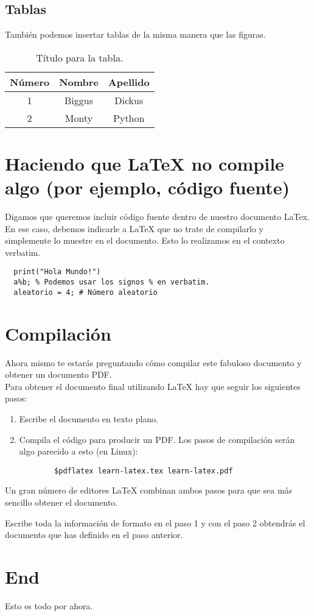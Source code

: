 \documentclass[12pt]{article}
\begin{document}
\subsection{Tablas}
También podemos insertar tablas de la misma manera que las figuras.

\begin{table}[H]
  \caption{Título para la tabla.}
  \begin{tabular}{c|cc}
    Número & Nombre & Apellido \\
    \hline %
    1 & Biggus & Dickus \\
    2 & Monty & Python
  \end{tabular}
\end{table}


\section{Haciendo que LaTeX no compile algo (por ejemplo, código fuente)}
Digamos que queremos incluir código fuente dentro de nuestro documento LaTex. En ese caso, debemos indicarle a LaTeX que no trate de compilarlo y simplemente lo muestre en el documento. Esto lo realizamos en el contexto verbatim.

\begin{verbatim}
  print("Hola Mundo!")
  a%b; % Podemos usar los signos % en verbatim.
  aleatorio = 4; # Número aleatorio
\end{verbatim}

\section{Compilación}

Ahora mismo te estarás preguntando cómo compilar este fabuloso documento y obtener un documento PDF.\\
Para obtener el documento final utilizando LaTeX hay que seguir los siguientes pasos:
  \begin{enumerate}
    \item Escribe el documento en texto plano.
    \item Compila el código para producir un PDF.
     Los pasos de compilación serán algo parecido a esto (en Linux): \\
     \begin{verbatim}
        $pdflatex learn-latex.tex learn-latex.pdf
     \end{verbatim}
  \end{enumerate}

Un gran número de editores LaTeX combinan ambos pasos para que sea más sencillo obtener el documento.

Escribe toda la información de formato en el paso 1 y con el paso 2 obtendrás el documento que has definido en el paso anterior.

\section{End}

Esto es todo por ahora.

\end{document}
